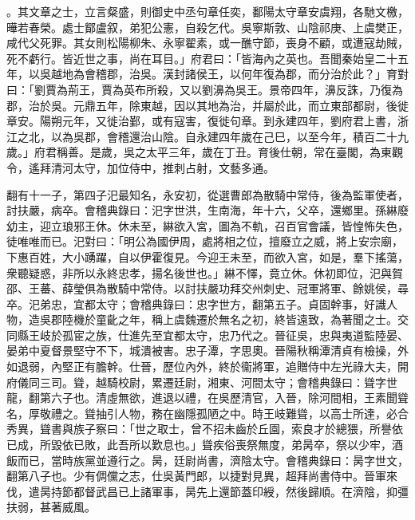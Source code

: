 \begin{pinyinscope}
。其文章之士，立言粲盛，則御史中丞句章任奕，鄱陽太守章安虞翔，各馳文檄，曄若春榮。處士鄮盧叙，弟犯公憲，自殺乞代。吳寧斯敦、山陰祁庚、上虞樊正，咸代父死罪。其女則松陽柳朱、永寧翟素，或一醮守節，喪身不顧，或遭寇劫賊，死不虧行。皆近世之事，尚在耳目。」府君曰：「皆海內之英也。吾聞秦始皇二十五年，以吳越地為會稽郡，治吳。漢封諸侯王，以何年復為郡，而分治於此？」育對曰：「劉賈為荊王，賈為英布所殺，又以劉濞為吳王。景帝四年，濞反誅，乃復為郡，治於吳。元鼎五年，除東越，因以其地為治，并屬於此，而立東部都尉，後徙章安。陽朔元年，又徙治鄞，或有寇害，復徙句章。到永建四年，劉府君上書，浙江之北，以為吳郡，會稽還治山陰。自永建四年歲在己巳，以至今年，積百二十九歲。」府君稱善。是歲，吳之太平三年，歲在丁丑。育後仕朝，常在臺閣，為東觀令，遙拜清河太守，加位侍中，推刺占射，文藝多通。

翻有十一子，第四子汜最知名，永安初，從選曹郎為散騎中常侍，後為監軍使者，討扶嚴，病卒。會稽典錄曰：汜字世洪，生南海，年十六，父卒，還鄉里。孫綝廢幼主，迎立琅邪王休。休未至，綝欲入宮，圖為不軌，召百官會議，皆惶怖失色，徒唯唯而已。汜對曰：「明公為國伊周，處將相之位，擅廢立之威，將上安宗廟，下惠百姓，大小踴躍，自以伊霍復見。今迎王未至，而欲入宮，如是，羣下搖蕩，衆聽疑惑，非所以永終忠孝，揚名後世也。」綝不懌，竟立休。休初即位，汜與賀邵、王蕃、薛瑩俱為散騎中常侍。以討扶嚴功拜交州刺史、冠軍將軍、餘姚侯，尋卒。汜弟忠，宜都太守；會稽典錄曰：忠字世方，翻第五子。貞固幹事，好識人物，造吳郡陸機於童齔之年，稱上虞魏遷於無名之初，終皆遠致，為著聞之士。交同縣王岐於孤宦之族，仕進先至宜都太守，忠乃代之。晉征吳，忠與夷道監陸晏、晏弟中夏督景堅守不下，城潰被害。忠子潭，字思奧。晉陽秋稱潭清貞有檢操，外如退弱，內堅正有膽幹。仕晉，歷位內外，終於衞將軍，追贈侍中左光祿大夫，開府儀同三司。聳，越騎校尉，累遷廷尉，湘東、河間太守；會稽典錄曰：聳字世龍，翻第六子也。清虛無欲，進退以禮，在吳歷清官，入晉，除河間相，王素聞聳名，厚敬禮之。聳抽引人物，務在幽隱孤陋之中。時王岐難聳，以高士所達，必合秀異，聳書與族子察曰：「世之取士，曾不招未齒於丘園，索良才於總猥，所譽依已成，所毀依已敗，此吾所以歎息也。」聳疾俗喪祭無度，弟昺卒，祭以少牢，酒飯而已，當時族黨並遵行之。昺，廷尉尚書，濟陰太守。會稽典錄曰：昺字世文，翻第八子也。少有倜儻之志，仕吳黃門郎，以捷對見異，超拜尚書侍中。晉軍來伐，遣昺持節都督武昌已上諸軍事，昺先上還節蓋印綬，然後歸順。在濟陰，抑彊扶弱，甚著威風。


\end{pinyinscope}